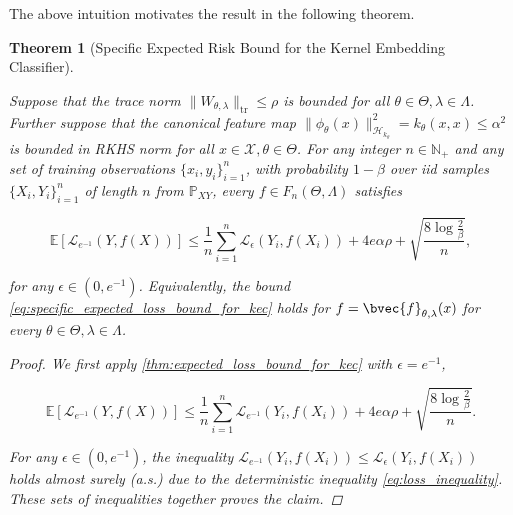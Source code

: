 \documentclass{article}
\newtheorem{theorem}{Theorem}[section]
\begin{document}
		The above intuition motivates the result in the following theorem.
	
		\begin{theorem}[Specific Expected Risk Bound for the Kernel Embedding Classifier]
			\label{thm:specific_expected_loss_bound_for_kec}
			
			Suppose that the trace norm $\| W_{\theta, \lambda} \|_{\mathrm{tr}} \leq \rho$ is bounded for all $\theta \in \Theta, \lambda \in \Lambda$. Further suppose that the canonical feature map $\| \phi_{\theta}(x) \|_{\mathcal{H}_{k_{\theta}}}^{2} = k_{\theta}(x, x) \leq \alpha^{2}$ is bounded in RKHS norm for all $x \in \mathcal{X}, \theta \in \Theta$. For any integer $n \in \mathbb{N}_{+}$ and any set of training observations $\{x_{i}, y_{i}\}_{i = 1}^{n}$, with probability $1 - \beta$ over \textit{iid} samples $\{X_{i}, Y_{i}\}_{i = 1}^{n}$ of length $n$ from $\mathbb{P}_{X Y}$, every $f \in F_{n}(\Theta, \Lambda)$ satisfies
			
			\begin{equation}
			\mathbb{E}[\mathcal{L}_{e^{-1}}(Y, f(X))] \leq \frac{1}{n} \sum_{i = 1}^{n} \mathcal{L}_{\epsilon}(Y_{i}, f(X_{i})) + 4 e \alpha \rho + \sqrt{\frac{8 \log{\frac{2}{\beta}}}{n}},
			\label{eq:specific_expected_loss_bound_for_kec}
			\end{equation}
			
			for any $\epsilon \in (0, e^{-1})$. Equivalently, the bound \eqref{eq:specific_expected_loss_bound_for_kec} holds for $f = \bvec{f}_{\theta, \lambda}(x)$ for every $\theta \in \Theta, \lambda \in \Lambda$.
			
			\begin{proof}
				
				We first apply \cref{thm:expected_loss_bound_for_kec} with $\epsilon = e^{-1}$,
				
				\begin{equation}
					\mathbb{E}[\mathcal{L}_{e^{-1}}(Y, f(X))] \leq \frac{1}{n} \sum_{i = 1}^{n} \mathcal{L}_{e^{-1}}(Y_{i}, f(X_{i})) + 4 e \alpha \rho + \sqrt{\frac{8 \log{\frac{2}{\beta}}}{n}}.
				\end{equation}
				
				For any $\epsilon \in (0, e^{-1})$, the inequality $\mathcal{L}_{e^{-1}}(Y_{i}, f(X_{i})) \leq \mathcal{L}_{\epsilon}(Y_{i}, f(X_{i}))$ holds almost surely (a.s.) due to the deterministic inequality \eqref{eq:loss_inequality}. These sets of inequalities together proves the claim.
			\end{proof}
		\end{theorem}
\end{document}
